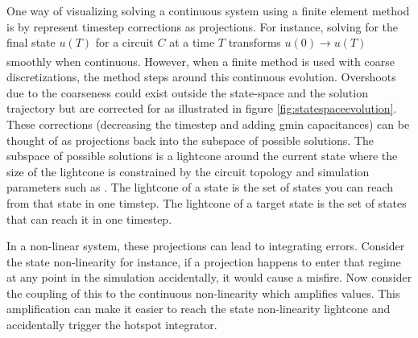 One way of visualizing solving a continuous system using a finite element method is by
represent timestep corrections
as projections. For instance, solving for the final state $u(T)$ for a circuit $C$ at a time $T$ 
transforms $u(0)\xrightarrow[]{} u(T)$ smoothly when continuous. However, when a finite method is used
with coarse discretizations, the method steps around this continuous evolution. Overshoots due to the
coarseness could exist outside the state-space and the solution trajectory but are corrected for
as illustrated in figure \ref{fig:statespaceevolution}. 
These corrections (decreasing the timestep and adding gmin capacitances) can be thought of as projections
back into the subspace of possible solutions. The subspace of possible solutions is
a lightcone around the current state where the size of the lightcone is constrained
by the circuit topology and simulation parameters such as . The lightcone
of a state is the set of states you can reach from that state in one timstep. The
lightcone of a target state is the set of states that can reach it in one timestep.

In a non-linear system, these projections can lead to integrating errors. Consider the
state non-linearity for instance, if a projection happens to enter that regime at any
point in the simulation accidentally, it would cause a misfire. Now consider the coupling
of this to the continuous non-linearity which amplifies values. This amplification can
make it easier to reach the state non-linearity lightcone and accidentally trigger
the hotspot integrator.

